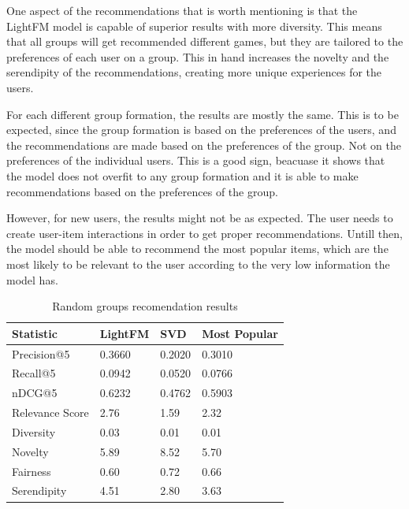 \documentclass{article}
\begin{document}
One aspect of the recommendations that is worth mentioning is that the LightFM model is capable of superior results with more diversity. This means that all groups will get recommended different games, but they are tailored to the preferences of each user on a group. This in hand increases the novelty and the serendipity of the recommendations, creating more unique experiences for the users.

For each different group formation, the results are mostly the same. This is to be expected, since the group formation is based on the preferences of the users, and the recommendations are made based on the preferences of the group. Not on the preferences of the individual users. This is a good sign, beacuase it shows that the model does not overfit to any group formation and it is able to make recommendations based on the preferences of the group.

However, for new users, the results might not be as expected. The user needs to create user-item interactions in order to get proper recommendations. Untill then, the model should be able to recommend the most popular items, which are the most likely to be relevant to the user according to the very low information the model has.

\begin{table}[]
    \centering
    \begin{tabular}{|l|l|l|l|}
        \hline
        \textbf{Statistic} & \textbf{LightFM} & \textbf{SVD} & \textbf{Most Popular} \\ \hline
        Precision@5        & 0.3660           & 0.2020       & 0.3010                \\
        Recall@5           & 0.0942           & 0.0520       & 0.0766                \\
        nDCG@5             & 0.6232           & 0.4762       & 0.5903                \\
        Relevance Score    & 2.76             & 1.59         & 2.32                  \\
        Diversity          & 0.03             & 0.01         & 0.01                  \\
        Novelty            & 5.89             & 8.52         & 5.70                  \\
        Fairness           & 0.60             & 0.72         & 0.66                  \\
        Serendipity        & 4.51             & 2.80         & 3.63                  \\ \hline
    \end{tabular}
    \caption{Random groups recomendation results}
    \label{tab:resultados-modelos}
\end{table}
\end{document}
